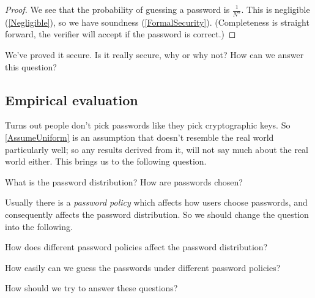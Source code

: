 \begin{frame}
  \begin{proof}
    We see that the probability of guessing a password is \(\frac{1}{N^n}\).
    This is negligible (\cref{Negligible}), so we have soundness 
    (\cref{FormalSecurity}).
    (Completeness is straight forward, the verifier will accept if the password 
    is correct.)
  \end{proof}
\end{frame}

\begin{frame}
  \begin{exercise}
    We've proved it secure.
    Is it really secure, why or why not?
    How can we answer this question?
  \end{exercise}
\end{frame}

\subsection{Empirical evaluation}

Turns out people don't pick passwords like they pick cryptographic keys.
So \cref{AssumeUniform} is an assumption that doesn't resemble the real world 
particularly well; so any results derived from it, will not say much about the 
real world either.
This brings us to the following question.

\begin{frame}
\begin{question}\label{PasswordDistribution}
  What is the password distribution?
  How are passwords chosen?
\end{question}
\end{frame}

Usually there is a \emph{password policy} which affects how users choose 
passwords, and consequently affects the password distribution.
So we should change the question into the following.

\begin{frame}
\begin{question}
  How does different password policies affect the password distribution?
\end{question}
\begin{question}\label{Guessability}
  How easily can we guess the passwords under different password policies?
\end{question}
\begin{exercise}
  How should we try to answer these questions?
\end{exercise}
\end{frame}

